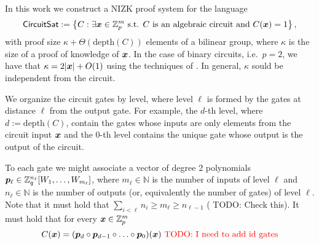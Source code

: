 
\newcommand{\setsize}{t}

In this work we construct a NIZK proof system for the language
\[
\mathsf{CircuitSat}:=\left\{
	C : \exists {\boldsymbol{x}}\in\mathbb{Z}_p^m \text{ s.t. } C \text{ is an algebraic circuit and } C({\boldsymbol{x}})=1
	\right\},
\]
with proof size $\kappa+\Theta(\mathrm{depth}(C))$ elements of a bilinear group, where $\kappa$ is the size of a proof of knowledge of ${\boldsymbol{x}}$. In the case of binary circuits, i.e.~$p=2$, we have that $\kappa=2|{\boldsymbol{x}}|+O(1)$ using the techniques of \cite{AC:GonHevRaf15}. In general, $\kappa$ sould be independent from the circuit.


We organize the circuit gates by level, where level $\ell$ is formed by the gates at distance $\ell$ from the output gate. For example, the $d$-th level, where $d:=\mathrm{depth}({C})$, contain the gates whose inputs are only elements from the circuit input ${\boldsymbol{x}}$ and the $0$-th level contains the unique gate whose output is the output of the circuit.

To each gate we might associate a vector of degree 2 polynomials ${\boldsymbol{p}}_\ell \in \mathbb{Z}_q^{n_\ell}[W_1,\ldots,W_{m_\ell}]$, where $m_\ell\in\mathbb{N}$ is the number of inputs of level $\ell$ and $n_\ell\in\mathbb{N}$ is the number of outputs (or, equivalently the number of gates) of level $\ell$. Note that it must hold that $\sum_{i<\ell} n_i\geq m_\ell \geq n_{\ell-1}$ ({\color{red} TODO: Check this}). It must hold that for every ${\boldsymbol{x}}\in\mathbb{Z}_p^m$
$$
C({\boldsymbol{x}}) = ({\boldsymbol{p}}_{d}\circ{\boldsymbol{p}}_{d-1}\circ\ldots\circ {\boldsymbol{p}}_0) ({\boldsymbol{x}}) \text{  \color{red} TODO: I need to add id gates}
$$

